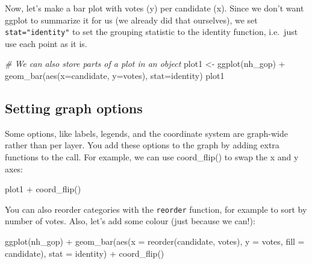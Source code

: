 \documentclass[
]{article}
\newenvironment{Shaded}{\begin{snugshade}}{\end{snugshade}}
\newcommand{\AttributeTok}[1]{\textcolor[rgb]{0.77,0.63,0.00}{#1}}
\newcommand{\CommentTok}[1]{\textcolor[rgb]{0.56,0.35,0.01}{\textit{#1}}}
\newcommand{\FunctionTok}[1]{\textcolor[rgb]{0.00,0.00,0.00}{#1}}
\newcommand{\NormalTok}[1]{#1}
\newcommand{\OtherTok}[1]{\textcolor[rgb]{0.56,0.35,0.01}{#1}}
\newcommand{\SpecialCharTok}[1]{\textcolor[rgb]{0.00,0.00,0.00}{#1}}
\newcommand{\StringTok}[1]{\textcolor[rgb]{0.31,0.60,0.02}{#1}}
\begin{document}
Now, let's make a bar plot with votes (y) per candidate (x). Since we
don't want ggplot to summarize it for us (we already did that
ourselves), we set \texttt{stat="identity"} to set the grouping
statistic to the identity function, i.e.~just use each point as it is.

\begin{Shaded}
\begin{Highlighting}[]
\CommentTok{\# We can also store parts of a plot in an object}
\NormalTok{plot1 }\OtherTok{\textless{}{-}} \FunctionTok{ggplot}\NormalTok{(nh\_gop) }\SpecialCharTok{+} 
  \FunctionTok{geom\_bar}\NormalTok{(}\FunctionTok{aes}\NormalTok{(}\AttributeTok{x=}\NormalTok{candidate, }\AttributeTok{y=}\NormalTok{votes), }
           \AttributeTok{stat=}\StringTok{\textquotesingle{}identity\textquotesingle{}}\NormalTok{)}
\NormalTok{plot1}
\end{Highlighting}
\end{Shaded}

\hypertarget{setting-graph-options}{%
\subsection{Setting graph options}\label{setting-graph-options}}

Some options, like labels, legends, and the coordinate system are
graph-wide rather than per layer. You add these options to the graph by
adding extra functions to the call. For example, we can use
coord\_flip() to swap the x and y axes:

\begin{Shaded}
\begin{Highlighting}[]
\NormalTok{plot1 }\SpecialCharTok{+} 
  \FunctionTok{coord\_flip}\NormalTok{()}
\end{Highlighting}
\end{Shaded}

You can also reorder categories with the \texttt{reorder} function, for
example to sort by number of votes. Also, let's add some colour (just
because we can!):

\begin{Shaded}
\begin{Highlighting}[]
\FunctionTok{ggplot}\NormalTok{(nh\_gop) }\SpecialCharTok{+} 
  \FunctionTok{geom\_bar}\NormalTok{(}\FunctionTok{aes}\NormalTok{(}\AttributeTok{x =} \FunctionTok{reorder}\NormalTok{(candidate, votes), }\AttributeTok{y =}\NormalTok{ votes, }\AttributeTok{fill =}\NormalTok{ candidate), }
           \AttributeTok{stat =} \StringTok{\textquotesingle{}identity\textquotesingle{}}\NormalTok{) }\SpecialCharTok{+} 
  \FunctionTok{coord\_flip}\NormalTok{()}
\end{Highlighting}
\end{Shaded}
\end{document}
